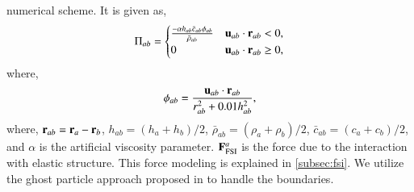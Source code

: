 numerical scheme. It is given as,
\begin{align}
  \label{eq:mom-av}
  \Pi_{ab} =
  \begin{cases}
\frac{-\alpha h_{ab} \bar{c}_{ab} \phi_{ab}}{\bar{\rho}_{ab}}
  & \mathbf{u}_{ab}\cdot \mathbf{r}_{ab} < 0, \\
  0 & \mathbf{u}_{ab}\cdot \mathbf{r}_{ab} \ge 0,
\end{cases}
\end{align}
where,
%
\begin{equation}
  \label{eq:av-phiij}
  \phi_{ab} = \frac{\mathbf{u}_{ab} \cdot \mathbf{r}_{ab}}{r^2_{ab} + 0.01 h^2_{ab}},
\end{equation}
%
where, $\mathbf{r}_{ab} = \mathbf{r}_a - \mathbf{r}_b$, $h_{ab} = (h_a + h_b)/2$,
$\bar{\rho}_{ab} = (\rho_a + \rho_b)/2$, $\bar{c}_{ab} = (c_a + c_b) / 2$, and
$\alpha$ is the artificial viscosity parameter. $\mathbf{F}^a_{\text{FSI}}$ is the
force due to the interaction with elastic structure. This force modeling is
explained in \cref{subsec:fsi}. We utilize the ghost particle approach proposed
in \citep{Adami2012} to handle the boundaries.



